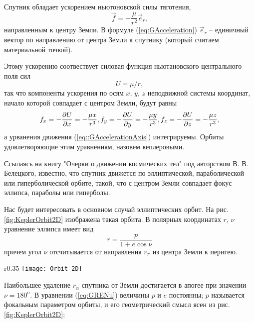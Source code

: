 Спутник обладает ускорением ньютоновской силы тяготения,
\begin{equation}  \label{eq:GAcceleration}
  \vec{f} = - \frac{\mu}{r^2}\vec{e}_r,
\end{equation}
направленным к центру Земли. В формуле (\ref{eq:GAcceleration}) $\vec{e}_r$ --
единичный вектор по направлению от центра Земли к спутнику (который считаем материальной точкой).\par
Этому ускорению соотвествует силовая функция ньютановского центрального поля сил
\begin{equation}
  U = \mu/r,
\end{equation}
так что компоненты ускорения по осям $x$, $y$, $z$ неподвижной системы координат,
начало которой совпадает с центром Земли, будут равны
\begin{equation} \label{eq::GAccelerationAxis}
  f_x = -\frac{\partial U}{\partial x} = - \frac{\mu x}{r^3}, \\
  f_y = -\frac{\partial U}{\partial y} = - \frac{\mu y}{r^3}, \\
  f_z = -\frac{\partial U}{\partial z} = - \frac{\mu z}{r^3},
\end{equation}
а урванения движения (\ref{eq::GAccelerationAxis}) интегрируемы. Орбиты удовлетворяющие
этим уравнениям, назовем кеплеровыми.\par
Ссылаясь на книгу "Очерки о движении космических тел" под авторством В. В. Белецкого,
известно, что спутник движется по эллиптической, параболической или гиперболической орбите,
такой, что с центром Земли совпадает фокус эллипса, параболы или гиперболы.\par
Нас будет интересовать в основном случай эллиптических орбит. На рис. \ref{fig:KeplerOrbit2D}
изображена такая орбита. В полярных координатах $r$, $\nu$ уравнение эллипса имеет вид
\begin{equation} \label{eq:GRENu}
  r = \frac{p}{1 + e\cos\nu}
\end{equation}
причем угол $\nu$ отсчитывается от направления $r_{\pi}$ из центра Земли к перигею.
\begin{wrapfigure}{r}{0.35\textwidth}
  \centering
  \texttt{[image: Orbit\_2D]}
  \caption{Кеплеровская эллиптическая орбита}
  \label{fig:KeplerOrbit2D}
\end{wrapfigure}
Наибольшее удаление $r_{\alpha}$ спутника от Земли достигается в апогее при значении
$\nu = 180^{o}$. В уравнении (\ref{eq:GRENu}) величины $p$ и $e$ постоянны; $p$ называется
фокальным параметром орбиты, и его геометрический смысл ясен из рис. \ref{fig:KeplerOrbit2D};
